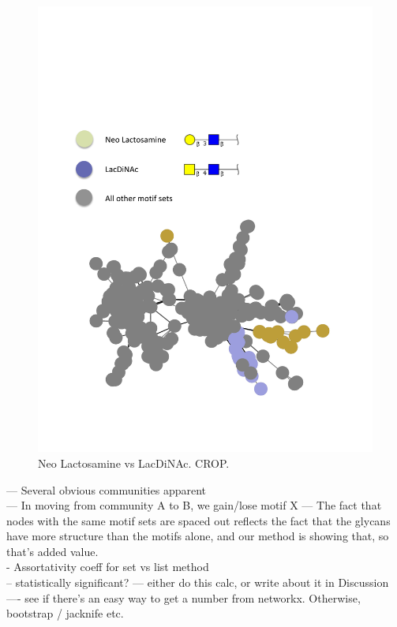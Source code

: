 \documentclass[12pt,a4paper]{article}
\begin{document}
\begin{figure}[H]
\centering 
\includegraphics[scale=0.9]{motif_similarity_exploration/Neo_Lactosamine_vs_LacDiNAc.pdf} 
\caption{Neo Lactosamine vs LacDiNAc. CROP.}
\label{fig:Neo_Lactosamine_vs_LacDiNAc}
\end{figure}


--- Several obvious communities apparent\\
--- In moving from community A to B, we gain/lose motif X
--- The fact that nodes with the same motif sets are spaced out reflects the fact that the glycans have more structure than the motifs alone, and our method is showing that, so that's added value.\\

- Assortativity coeff for set vs list method\\
-- statistically significant?
--- either do this calc, or write about it in Discussion \\
---- see if there's an easy way to get a number from networkx. Otherwise, bootstrap / jacknife etc. \\
\end{document}
